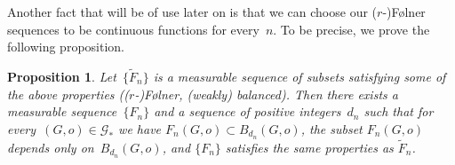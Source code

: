\documentclass[10pt,a4paper]{amsart}
\newtheorem{proposition}[lemma]{Proposition}
\begin{document}
Another fact that will be of use later on is that we can choose our ($r$-)F\o lner sequences to be continuous functions for every~$n$. To be precise, we prove the following proposition. 
\begin{proposition}\label{proposition:Folner_continuous}
Let~$\{\tilde F_n\}$ is a measurable sequence of subsets satisfying some of the above properties (($r$-)F\o lner, (weakly) balanced). Then there exists a measurable sequence~$\{F_n\}$ and a sequence of positive integers~$d_n$ such that for every~$(G,o) \in \mathcal{G}_*$ we have $F_n(G,o) \subset B_{d_n}(G,o)$, the subset $F_n(G,o)$ depends only on~$B_{d_n}(G,o)$, and $\{F_n\}$ satisfies the same properties as $\tilde F_n$. 
\end{proposition}
\end{document}
